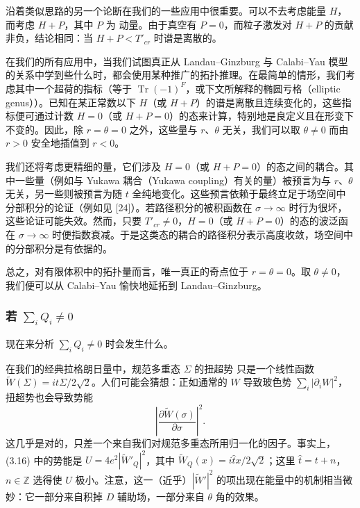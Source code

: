 沿着类似思路的另一个论断在我们的一些应用中很重要。可以不去考虑能量 $H$，而考虑 $H+P$，其中 $P$ 为
\label{op:25}
动量。由于真空有 $P=0$，而粒子激发对 $H+P$ 的贡献非负，结论相同：当 $H+P<T'_{cr}$ 时谱是离散的。

在我们的所有应用中，当我们试图真正从 Landau--Ginzburg 与 Calabi--Yau 模型的关系中学到些什么时，都会使用某种推广的拓扑推理。在最简单的情形，我们考虑其中一个超荷的指标（等于 $\operatorname{Tr}(-1)^F$，或下文所解释的椭圆亏格（elliptic genus））。已知在某正常数以下 $H$（或 $H+P$）的谱是离散且连续变化的，这些指标便可通过计数 $H=0$（或 $H+P=0$）的态来计算，特别地是良定义且在形变下不变的。因此，除 $r=\theta=0$ 之外，这些量与 $r$、$\theta$ 无关，我们可以取 $\theta\neq0$ 而由 $r>0$ 安全地插值到 $r<0$。

我们还将考虑更精细的量，它们涉及 $H=0$（或 $H+P=0$）的态之间的耦合。其中一些量（例如与 Yukawa 耦合（Yukawa coupling）有关的量）被预言为与 $r$、$\theta$ 无关，另一些则被预言为随 $t$ 全纯地变化。这些预言依赖于最终立足于场空间中分部积分的论证（例如见 [24]）。若路径积分的被积函数在 $\sigma\to\infty$ 时行为很坏，这些论证可能失效。然而，只要 $T'_{cr}\neq0$，$H=0$（或 $H+P=0$）的态的波泛函在 $\sigma\to\infty$ 时便指数衰减。于是这类态的耦合的路径积分表示高度收敛，场空间中的分部积分是有依据的。

总之，对有限体积中的拓扑量而言，唯一真正的奇点位于 $r=\theta=0$。取 $\theta\neq0$，我们便可以从 Calabi--Yau 愉快地延拓到 Landau--Ginzburg。

\subsubsection*{若 $\sum_iQ_i\neq0$}

现在来分析 $\sum_iQ_i\neq0$ 时会发生什么。

在我们的经典拉格朗日量中，规范多重态 $\Sigma$ 的扭超势
\label{op:26}
只是一个线性函数 $\widetilde W(\Sigma)=it\Sigma/2\sqrt2$。人们可能会猜想：正如通常的 $W$ 导致玻色势 $\sum_i|\partial_iW|^2$，扭超势也会导致势能
\begin{equation}\tag{3.18}
\left|\frac{\partial\widetilde W(\sigma)}{\partial\sigma}\right|^2.
\end{equation}
这几乎是对的，只差一个来自我们对规范多重态所用归一化的因子。事实上，(3.16) 中的势能是 $U=4e^2|\widetilde W'_Q|^2$，其中 $\widetilde W_Q(x)=i\hat tx/2\sqrt2$；这里 $\hat t=t+n$，$n\in\mathbb{Z}$ 选得使 $U$ 极小。注意，这一（近乎）$|\widetilde W'|^2$ 的项出现在能量中的机制相当微妙：它一部分来自积掉 $D$ 辅助场，一部分来自 $\theta$ 角的效果。

